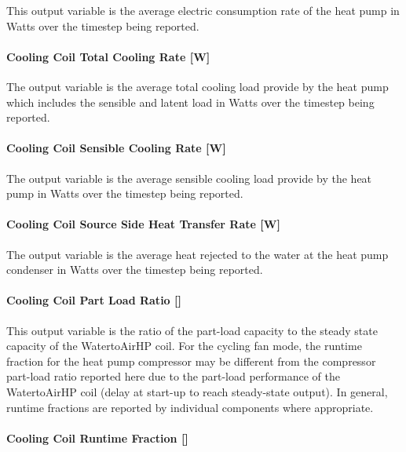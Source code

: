 This output variable is the average electric consumption rate of the heat pump in Watts over the timestep being reported.

\paragraph{Cooling Coil Total Cooling Rate {[}W{]}}\label{cooling-coil-total-cooling-rate-w-8}

The output variable is the average total cooling load provide by the heat pump which includes the sensible and latent load in Watts over the timestep being reported.

\paragraph{Cooling Coil Sensible Cooling Rate {[}W{]}}\label{cooling-coil-sensible-cooling-rate-w-8}

The output variable is the average sensible cooling load provide by the heat pump in Watts over the timestep being reported.

\paragraph{Cooling Coil Source Side Heat Transfer Rate {[}W{]}}\label{cooling-coil-source-side-heat-transfer-rate-w-1}

The output variable is the average heat rejected to the water at the heat pump condenser in Watts over the timestep being reported.

\paragraph{\texorpdfstring{Cooling Coil Part Load Ratio {[]}}{Cooling Coil Part Load Ratio }}\label{cooling-coil-part-load-ratio-1}

This output variable is the ratio of the part-load capacity to the steady state capacity of the WatertoAirHP coil. For the cycling fan mode, the runtime fraction for the heat pump compressor may be different from the compressor part-load ratio reported here due to the part-load performance of the WatertoAirHP coil (delay at start-up to reach steady-state output). In general, runtime fractions are reported by individual components where appropriate.

\paragraph{\texorpdfstring{Cooling Coil Runtime Fraction {[]}}{Cooling Coil Runtime Fraction }}\label{cooling-coil-runtime-fraction-6}

